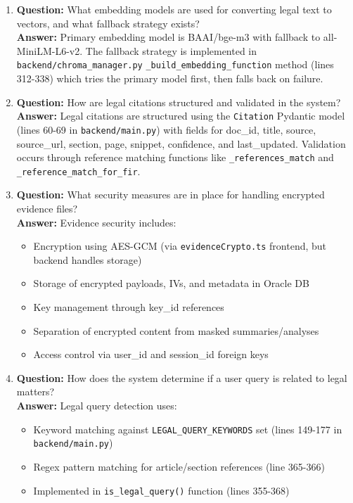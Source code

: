 \documentclass[11pt]{article}
\begin{document}
\begin{enumerate}
\item \textbf{Question:} What embedding models are used for converting legal text to vectors, and what fallback strategy exists?
\\ \textbf{Answer:} Primary embedding model is BAAI/bge-m3 with fallback to all-MiniLM-L6-v2. The fallback strategy is implemented in \texttt{backend/chroma\_manager.py} \texttt{\_build\_embedding\_function} method (lines 312-338) which tries the primary model first, then falls back on failure.

\item \textbf{Question:} How are legal citations structured and validated in the system?
\\ \textbf{Answer:} Legal citations are structured using the \texttt{Citation} Pydantic model (lines 60-69 in \texttt{backend/main.py}) with fields for doc\_id, title, source, source\_url, section, page, snippet, confidence, and last\_updated. Validation occurs through reference matching functions like \texttt{\_references\_match} and \texttt{\_reference\_match\_for\_fir}.

\item \textbf{Question:} What security measures are in place for handling encrypted evidence files?
\\ \textbf{Answer:} Evidence security includes:
\begin{itemize}
\item Encryption using AES-GCM (via \texttt{evidenceCrypto.ts} frontend, but backend handles storage)
\item Storage of encrypted payloads, IVs, and metadata in Oracle DB
\item Key management through key\_id references
\item Separation of encrypted content from masked summaries/analyses
\item Access control via user\_id and session\_id foreign keys
\end{itemize}

\item \textbf{Question:} How does the system determine if a user query is related to legal matters?
\\ \textbf{Answer:} Legal query detection uses:
\begin{itemize}
\item Keyword matching against \texttt{LEGAL\_QUERY\_KEYWORDS} set (lines 149-177 in \texttt{backend/main.py})
\item Regex pattern matching for article/section references (line 365-366)
\item Implemented in \texttt{is\_legal\_query()} function (lines 355-368)
\end{itemize}


\end{enumerate}
\end{document}
